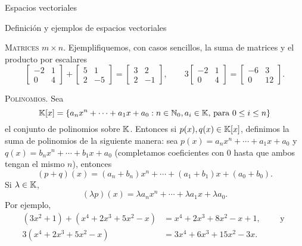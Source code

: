 \begin{chapter}{Espacios vectoriales}
\begin{section}{Definici\'on y ejemplos de espacios vectoriales}
\begin{ejemplo*}{\textsc{Matrices $m \times n$.}}
                Ejemplifiquemos, con casos sencillos, la suma de matrices y el producto por escalares
                \begin{equation*}
                \begin{bmatrix} -2&1\\0&4 \end{bmatrix} + \begin{bmatrix} 5&1\\2&-5 \end{bmatrix} =
                \begin{bmatrix} 3&2\\2&-1 \end{bmatrix}, \qquad 
                3\begin{bmatrix} -2&1\\0&4 \end{bmatrix} = \begin{bmatrix} -6&3\\0&12 \end{bmatrix}.
                \end{equation*}	
            \end{ejemplo*}
            
            \medspace
            
            \begin{ejemplo*}{\textsc{Polinomios.}} Sea 
                \begin{equation*}
                \mathbb K[x] = \{a_nx^n + \cdots + a_1x + a_0: n \in \mathbb N_0, a_i \in \mathbb K\text{, para } 0\le i \le n  \}
                \end{equation*}
                el conjunto de polinomios sobre $\mathbb K$. Entonces si $p(x), q(x) \in \mathbb K[x]$, definimos la suma de polinomios de la siguiente manera: sea $p(x) = a_nx^n + \cdots + a_1x + a_0$ y $q(x)= b_nx^n + \cdots + b_1x + a_0$ (completamos coeficientes con $0$ hasta que ambos tengan el mismo $n$), entonces
                \begin{equation*}
                (p+q)(x) = (a_n+b_n)x^n + \cdots + (a_1+ b_1)x + (a_0+b_0).
                \end{equation*}
                Si $\lambda \in \mathbb K$, 
                \begin{equation*}
                (\lambda p)(x) = \lambda a_nx^n + \cdots + \lambda a_1x + \lambda a_0.
                \end{equation*}
                Por ejemplo,
                \begin{align*}
                (3x^2 + 1)+(x^4 + 2x^3 + 5x^2-x) &= x^4 + 2x^3 + 8x^2-x +1, \qquad \text{ y } \\
                3(x^4 + 2x^3 + 5x^2-x) &= 3x^4 + 6x^3 + 15x^2-3x.
                \end{align*}
            \end{ejemplo*}
            

\end{section}
\end{chapter}
